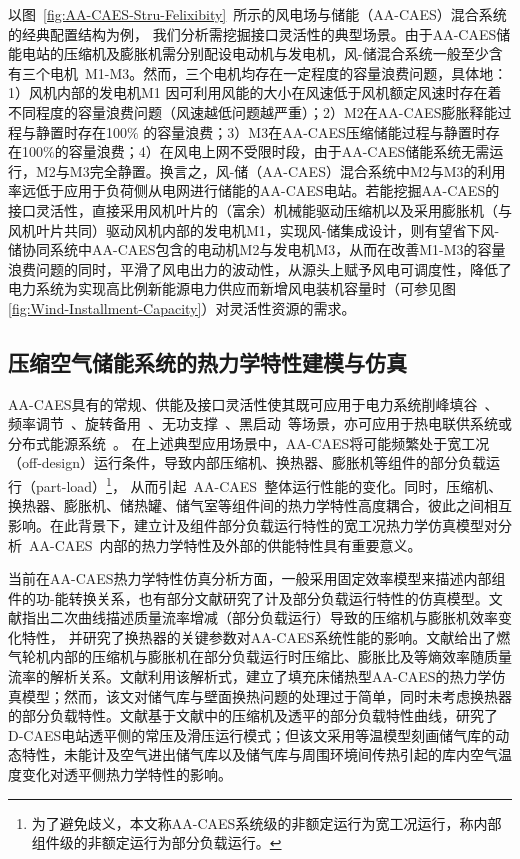 以图~\ref{fig:AA-CAES-Stru-Felixibity}~所示的风电场与储能（AA-CAES）混合系统的经典配置结构为例， 我们分析需挖掘接口灵活性的典型场景。由于AA-CAES储能电站的压缩机及膨胀机需分别配设电动机与发电机，风-储混合系统一般至少含有三个电机~M1-M3。然而，三个电机均存在一定程度的容量浪费问题，具体地：1）风机内部的发电机M1 因可利用风能的大小在风速低于风机额定风速时存在着不同程度的容量浪费问题（风速越低问题越严重）；2）M2在AA-CAES膨胀释能过程与静置时存在100$\%$ 的容量浪费；3）M3在AA-CAES压缩储能过程与静置时存在100$\%$的容量浪费；4）在风电上网不受限时段，由于AA-CAES储能系统无需运行，M2与M3完全静置。换言之，风-储（AA-CAES）混合系统中M2与M3的利用率远低于应用于负荷侧从电网进行储能的AA-CAES电站。若能挖掘AA-CAES的接口灵活性，直接采用风机叶片的（富余）机械能驱动压缩机以及采用膨胀机（与风机叶片共同）驱动风机内部的发电机M1，实现风-储集成设计，则有望省下风-储协同系统中AA-CAES包含的电动机M2与发电机M3，从而在改善M1-M3的容量浪费问题的同时，平滑了风电出力的波动性，从源头上赋予风电可调度性，降低了电力系统为实现高比例新能源电力供应而新增风电装机容量时（可参见图\ref{fig:Wind-Installment-Capacity}）对灵活性资源的需求。

\subsection{压缩空气储能系统的热力学特性建模与仿真}

AA-CAES具有的常规、供能及接口灵活性使其既可应用于电力系统削峰填谷~\cite{CAES-MultiValue-11,CAES-Princeton-08}、频率调节~\cite{CAES-Congession-09,CAES-Reserve-11}、旋转备用~\cite{CAES-Congession-09,CAES-Reserve-11}、无功支撑~\cite{CAES-Reactive-13,CAES-Reactive-18-LGK}、黑启动~\cite{Huntorf-20-01}等场景，亦可应用于热电联供系统或分布式能源系统~\cite{CAES-Review-18-Rui-operation,CAES-IES-16-Rui,Trigen-mCAES-15,CAES-Alberta-14}。 在上述典型应用场景中，AA-CAES将可能频繁处于宽工况（off-design）运行条件，导致内部压缩机、换热器、膨胀机等组件的部分负载运行（part-load）\footnote{为了避免歧义，本文称AA-CAES系统级的非额定运行为宽工况运行，称内部组件级的非额定运行为部分负载运行。}， 从而引起~AA-CAES~整体运行性能的变化。同时，压缩机、换热器、膨胀机、储热罐、储气室等组件间的热力学特性高度耦合，彼此之间相互影响。在此背景下，建立计及组件部分负载运行特性的宽工况热力学仿真模型对分析~AA-CAES~内部的热力学特性及外部的供能特性具有重要意义。

当前在AA-CAES热力学特性仿真分析方面，一般采用固定效率模型来描述内部组件的功-能转换关系，也有部分文献研究了计及部分负载运行特性的仿真模型。文献指出二次曲线描述质量流率增减（部分负载运行）导致的压缩机与膨胀机效率变化特性， 并研究了换热器的关键参数对AA-CAES系统性能的影响。文献给出了燃气轮机内部的压缩机与膨胀机在部分负载运行时压缩比、膨胀比及等熵效率随质量流率的解析关系。文献利用该解析式，建立了填充床储热型AA-CAES的热力学仿真模型；然而，该文对储气库与壁面换热问题的处理过于简单，同时未考虑换热器的部分负载特性。文献基于文献中的压缩机及透平的部分负载特性曲线，研究了D-CAES电站透平侧的常压及滑压运行模式；但该文采用等温模型刻画储气库的动态特性，未能计及空气进出储气库以及储气库与周围环境间传热引起的库内空气温度变化对透平侧热力学特性的影响。

